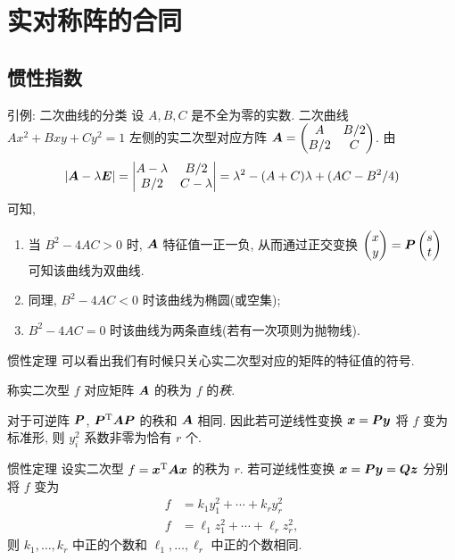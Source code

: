 \section{实对称阵的合同}

\subsection{惯性指数}

\begin{frame}{引例: 二次曲线的分类}
	\onslide<+->
	设 $A,B,C$ 是不全为零的实数.
	二次曲线 $Ax^2+Bxy+Cy^2=1$ 左侧的实二次型对应方阵 ${\boldsymbol{A}}=\begin{pmatrix}
		A&B/2\\
		B/2&C
	\end{pmatrix}$.
	\onslide<+->
	由
	\[|{\boldsymbol{A}}-\lambda{\boldsymbol{E}}|=\begin{vmatrix}
		A-\lambda&B/2\\
		B/2&C-\lambda
	\end{vmatrix}=\lambda^2-(A+C)\lambda+(AC-B^2/4)\]
	可知,
	\begin{enumerate}
		\item 当 $B^2-4AC>0$ 时, ${\boldsymbol{A}}$ 特征值一正一负, 
		\onslide<+->
		从而通过正交变换 $\begin{pmatrix}
			x\\y
		\end{pmatrix}={\boldsymbol{P}}\begin{pmatrix}
			s\\t
		\end{pmatrix}$ 可知该曲线为双曲线.
		\item 同理, $B^2-4AC<0$ 时该曲线为椭圆(或空集);
		\item $B^2-4AC=0$ 时该曲线为两条直线(若有一次项则为抛物线).
	\end{enumerate}
\end{frame}


\begin{frame}{惯性定理}
	\onslide<+->
	可以看出我们有时候只关心实二次型对应的矩阵的特征值的符号.
	\onslide<+->
	\begin{definition}
		称实二次型 $f$ 对应矩阵 ${\boldsymbol{A}}$ 的秩为 $f$ 的\emph{秩}.
	\end{definition}
	\onslide<+->
	对于可逆阵 ${\boldsymbol{P}}$, ${\boldsymbol{P}}^{\mathrm{T}}{\boldsymbol{A}}{\boldsymbol{P}}$ 的秩和 ${\boldsymbol{A}}$ 相同.
	\onslide<+->
	因此若可逆线性变换 ${\boldsymbol{x}}={\boldsymbol{P}}{\boldsymbol{y}}$ 将 $f$ 变为标准形, 则 $y_i^2$ 系数非零为恰有 $r$ 个.
	\onslide<+->
	\begin{second}{惯性定理}
		设实二次型 $f={\boldsymbol{x}}^{\mathrm{T}}{\boldsymbol{A}}{\boldsymbol{x}}$ 的秩为 $r$.
		若可逆线性变换 ${\boldsymbol{x}}={\boldsymbol{P}}{\boldsymbol{y}}={\boldsymbol{Q}}{\boldsymbol{z}}$ 分别将 $f$ 变为
		\begin{align*}
			f&=k_1y_1^2+\cdots+k_ry_r^2\\
			f&=\ell_1z_1^2+\cdots+\ell_rz_r^2,
		\end{align*}
		则 $k_1,\dots,k_r$ 中正的个数和 $\ell_1,\dots,\ell_r$ 中正的个数相同.
	\end{second}
\end{frame}


